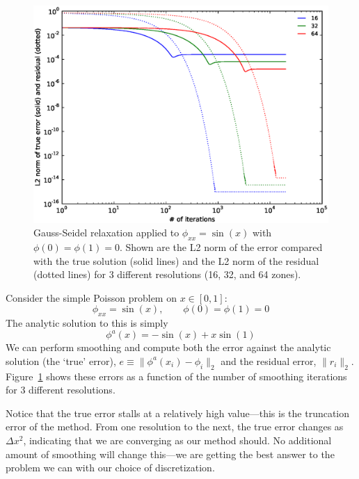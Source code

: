 \begin{figure}
\centering
\includegraphics[width=\linewidth]{smooth-error.eps}
\caption[Convergence as a function of number of iterations using Gauss-Seidel relaxation]{\label{fig:smootherror} Gauss-Seidel relaxation applied to
  $\phi_{xx} = \sin(x)$ with $\phi(0) = \phi(1) = 0$.  Shown are the
  L2 norm of the error compared with the true solution (solid lines)
  and the L2 norm of the residual (dotted lines) for 3 different
  resolutions (16, 32, and 64 zones).}
\end{figure}

Consider the simple Poisson problem on $x \in [0,1]$:
\begin{equation}
\phi_{xx} = \sin(x), \qquad \phi(0) = \phi(1) = 0
\end{equation}
The analytic solution to this is simply 
\begin{equation}
\phi^a(x) = -\sin(x) + x \sin(1)
\end{equation}
We can perform smoothing and compute both the error against the
analytic solution (the `true' error), $e \equiv \| \phi^a(x_i) - \phi_i \|_2$ and the
residual error, $\| r_i \|_2$.  Figure~\ref{fig:smootherror} shows these
errors as a function of the number of smoothing iterations for 3
different resolutions.

Notice that the true error stalls at a relatively high value---this is
the truncation error of the method.  From one resolution to the next,
the true error changes as $\Delta x^2$, indicating that we are
converging as our method should.  No additional amount of smoothing
will change this---we are getting the best answer to the problem we
can with our choice of discretization.

